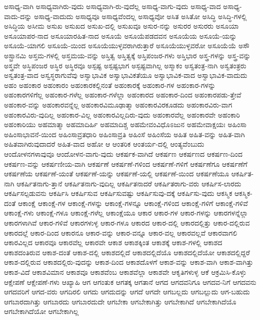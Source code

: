 {ಅಸಾಧ್ಯ-ವಾಗಿ
ಅಸಾಧ್ಯವಾಗಿರು-ವುದು
ಅಸಾಧ್ಯವಾಗಿ-ರು-ವುದೆಲ್ಲ
ಅಸಾಧ್ಯ-ವಾಗು-ವುದು
ಅಸಾಧ್ಯ-ವಾದ
ಅಸಾಧ್ಯ-ವಾದು-ದನ್ನು
ಅಸಾಧ್ಯ-ವಾದುದು
ಅಸಾಧ್ಯವೂ
ಅಸಾಧ್ಯವೆಂದಲ್ಲ
ಅಸಾಧ್ಯವೋ
ಅಸಿತ
ಅಸಿತೋ
ಅಸಿದ್ಧಿ
ಅಸಿದ್ಧಿ-ಗಳಲ್ಲಿ
ಅಸಿದ್ಧಿಯ
ಅಸೀಮ
ಅಸುಖ
ಅಸುಖದ
ಅಸುಖ-ದಲ್ಲಿ
ಅಸುಖವೂ
ಅಸುರ-ನನ್ನು
ಅಸುರರ
ಅಸುರರು
ಅಸೂಯಾ
ಅಸೂಯಾಪರ-ನಾದ
ಅಸೂಯಾರಹಿತ-ನಾದ
ಅಸೂಯೆ
ಅಸೂಯೆಪಡದವನ
ಅಸೂಯೆಯ
ಅಸೂಯೆ-ಯನ್ನು
ಅಸೂಯೆ-ಯಾಗಲಿ
ಅಸೂಯೆ-ಯಿಂದ
ಅಸೂಯೆಯುಳ್ಳವರಾಗಿರುತ್ತಾರೆ
ಅಸೂಯೆಯುಳ್ಳವರೋ
ಅಸೂಯೆಯೆ
ಅಸೌ
ಅಸ್ಟ್ರಾನಮಿ
ಅಸ್ತಮ-ಗಳಲ್ಲಿ
ಅಸ್ತಮಯ-ವನ್ನು
ಅಸ್ತಿತ್ವ
ಅಸ್ತಿತ್ವಕ್ಕೆ
ಅಸ್ತಿಪಂಜರ-ಗಳು
ಅಸ್ತಿಭಾರ
ಅಸ್ತ್ರ-ಗಳನ್ನು
ಅಸ್ತ್ರ-ವನ್ನು
ಅಸ್ತ್ರವೇ
ಅಸ್ಥಿಪಂಜರ
ಅಸ್ಥಿರ
ಅಸ್ಥಿರವೂ
ಅಸ್ಪಷ್ಟ
ಅಸ್ಪಷ್ಟಭಾಗ
ಅಸ್ಪಷ್ಟವಾಗಿಲ್ಲ
ಅಸ್ಮಾಕಂ
ಅಸ್ವತಂತ್ರ-ನಾಗಿ
ಅಸ್ವತಂತ್ರರು
ಅಸ್ವತಂತ್ರ-ವಾದ
ಅಸ್ವಸ್ಥರಾಗುವೆವು
ಅಸ್ವಾಭಾವಿಕ
ಅಸ್ವಾಭಾವಿಕತೆಯೂ
ಅಸ್ವಾಭಾವಿಕ-ವಾದ
ಅಸ್ವಾಭಾವಿಕ-ವಾದುದು
ಅಹಂ
ಅಹಂಕಾರ
ಅಹಂಕಾರಂ
ಅಹಂಕಾರಕಲ್ಲಿನಂತೆ
ಅಹಂಕಾರಕ್ಕೆ
ಅಹಂಕಾರ-ಗಳ
ಅಹಂಕಾರ-ಗಳನ್ನು
ಅಹಂಕಾರಗಳಿಗೆಲ್ಲ
ಅಹಂಕಾರ-ಗಳೆಲ್ಲ
ಅಹಂಕಾರ-ಗಳೆಲ್ಲಾ
ಅಹಂಕಾರದ
ಅಹಂಕಾರ-ದಿಂದ
ಅಹಂಕಾರಪಡು-ತ್ತೇವೆ
ಅಹಂಕಾರ-ವನ್ನು
ಅಹಂಕಾರವನ್ನೆಲ್ಲ
ಅಹಂಕಾರವಿಮೂಢಾತ್ಮಾ
ಅಹಂಕಾರವಿರಕೂಡದು
ಅಹಂಕಾರವಿರು-ವಾಗ
ಅಹಂಕಾರವಿರು-ವುದಿಲ್ಲ
ಅಹಂಕಾರ-ವಿಲ್ಲ
ಅಹಂಕಾರವಿಲ್ಲದಿರು-ವುದು
ಅಹಂಕಾರವೆಲ್ಲ
ಅಹಂಕಾರವೇ
ಅಹಂಕಾರಿ
ಅಹಂಕಾರಿಯು
ಅಹಮಾತ್ಮಾ
ಅಹಮಾದಿರ್ಹಿ
ಅಹಮಾದಿಶ್ಚ
ಅಹಮೇವಂವಿಧೊಽಜುನ
ಅಹಮೇವಾಕ್ಷಯಃ
ಅಹಿಂಸಾ
ಅಹಿಂಸಾಭಾವನೆ-ಯಿಂದ
ಅಹಿಂಸಾವ್ರತಧಾರಿ
ಅಹಿಂಸಾವ್ರತಿ
ಅಹಿಂಸೆ
ಅಹಿಂಸೆಯ
ಅಹಿತ
ಅಹಿತ-ವನ್ನು
ಅಹಿತ-ವಾಗಿ
ಅಹಿತವಾಗಿರುವುದಾದರೆ
ಅಹಿತ-ವಾದ
ಅಹೋ
ಆ
ಆಂತರಿಕ
ಆಂತರ್ಯ-ದಲ್ಲಿ
ಆಂತ್ಯವೆಂಬುದು
ಆಂದೋಳನಗಳಾವುವೂ
ಆಂದೋಳನ-ವಾಗು-ವುದು
ಆಕರ್ಷಕ-ವಾಗಿದೆ
ಆಕರ್ಷಣ
ಆಕರ್ಷಣದ
ಆಕರ್ಷಣ-ದಿಂದ
ಆಕರ್ಷಣ-ವನ್ನು
ಆಕರ್ಷಣೀಯ-ವಾಗಿ
ಆಕರ್ಷಣೆ
ಆಕರ್ಷಣೆ-ಗಳಿಂದ
ಆಕರ್ಷಣೆ-ಗಳಿಗೆ
ಆಕರ್ಷಣೆಗೂ
ಆಕರ್ಷಣೆಗೆ
ಆಕರ್ಷಣೆಯ
ಆಕರ್ಷಣೆ-ಯಂತೆ
ಆಕರ್ಷಣೆ-ಯನ್ನು
ಆಕರ್ಷಣೆ-ಯಲ್ಲಿ
ಆಕರ್ಷಣೆ-ಯಿಂದ
ಆಕರ್ಷಣೆಯೂ
ಆಕರ್ಷಿತ-ನಾಗಿ
ಆಕರ್ಷಿತನಾಗು-ತ್ತಾನೆ
ಆಕರ್ಷಿತನಾಗು-ವುದಿಲ್ಲ
ಆಕರ್ಷಿತನಾದರೆ
ಆಕರ್ಷಿತರಾಗು-ವರು
ಆಕರ್ಷಿಸ-ಲಾರದು
ಆಕರ್ಷಿಸಲ್ಪಡುವನು
ಆಕರ್ಷಿಸಿ
ಆಕರ್ಷಿಸುವ
ಆಕರ್ಷಿಸುವಷ್ಟು
ಆಕರ್ಷಿಸುವು-ದಕ್ಕೆ
ಆಕರ್ಷಿಸು-ವುದು
ಆಕಸ್ಮಿಕ
ಆಕಸ್ಮಿಕ-ದಂತೆ
ಆಕಾಂಕ್ಷೆ
ಆಕಾಂಕ್ಷೆ-ಗಳ
ಆಕಾಂಕ್ಷೆ-ಗಳನ್ನು
ಆಕಾಂಕ್ಷೆ-ಗಳನ್ನೂ
ಆಕಾಂಕ್ಷೆ-ಗಳಿಂದ
ಆಕಾಂಕ್ಷೆ-ಗಳಿಗೆ
ಆಕಾಂಕ್ಷೆ-ಗಳಿವೆ
ಆಕಾಂಕ್ಷೆ-ಗಳು
ಆಕಾಂಕ್ಷೆ-ಗಳೂ
ಆಕಾಂಕ್ಷೆ-ಗಳೆಲ್ಲ
ಆಕಾಂಕ್ಷೆಯೂ
ಆಕಾರ
ಆಕಾರ-ಗಳ
ಆಕಾರ-ಗಳನ್ನು
ಆಕಾರಗಳನ್ನೆಲ್ಲಾ
ಆಕಾರಗಳಾಗಿವೆ
ಆಕಾರ-ಗಳಿವೆ
ಆಕಾರಗಳುಳ್ಳ
ಆಕಾರ-ಗಳೂ
ಆಕಾರದ
ಆಕಾರ-ದಲ್ಲಿ
ಆಕಾರದಲ್ಲಿತ್ತು
ಆಕಾರ-ದಲ್ಲಿರುವ
ಆಕಾರದಲ್ಲೆ
ಆಕಾರ-ದಿಂದ
ಆಕಾರನೂ
ಆಕಾರ-ವನ್ನು
ಆಕಾರ-ವನ್ನೂ
ಆಕಾರ-ವಲ್ಲ
ಆಕಾರವಲ್ಲವೆ
ಆಕಾರವಾಗಲಿ
ಆಕಾರವಿಲ್ಲದ
ಆಕಾರವೂ
ಆಕಾರವೆಲ್ಲ
ಆಕಾರವೇ
ಆಕಾಶ
ಆಕಾಶಕ್ಕಿಂತ
ಆಕಾಶಕ್ಕೆ
ಆಕಾಶ-ಗಳಲ್ಲಿ
ಆಕಾಶದ
ಆಕಾಶದಂತಿರುವ
ಆಕಾಶ-ದಂತೆ
ಆಕಾಶ-ದಲ್ಲಿ
ಆಕಾಶದಲ್ಲಿದೆ
ಆಕಾಶದಲ್ಲಿದೆಯೊ
ಆಕಾಶದಲ್ಲಿದೆಯೋ
ಆಕಾಶದಲ್ಲಿದ್ದರೆ
ಆಕಾಶ-ದಲ್ಲಿರುವ
ಆಕಾಶದಲ್ಲಿರು-ವುದನ್ನು
ಆಕಾಶ-ದಿಂದ
ಆಕಾಶದೊಳಗೆ
ಆಕಾಶ-ವನ್ನು
ಆಕಾಶ-ವಾಗಿ
ಆಕಾಶ-ವಾಗಿತ್ತು
ಆಕಾಶ-ವಿದೆ
ಆಕಾಶವಿಮಾನ
ಆಕಾಶವೂ
ಆಕಾಶವೆಂಬ
ಆಕಾಶವೆಲ್ಲಾ
ಆಕಾಶವೇ
ಆಕೃತಿಗಳುಳ್ಳ
ಆಕೆ
ಆಕ್ರಮಿಸಿ-ಕೊಳ್ಳು
ಆಕ್ಷೇಪಣೆ
ಆಕ್ಷೇಪಣೆ-ಗಳು
ಆಖ್ಯಾಹಿ
ಆಗ
ಆಗಂತುಕ
ಆಗತಕ್ಕ
ಆಗತಾನೆ
ಆಗದ
ಆಗದವನಿಗೂ
ಆಗದವ-ನಿಗೆ
ಆಗದವನು
ಆಗದವರಿಗೆ
ಆಗದ-ವರು
ಆಗದಿರಲಿ
ಆಗದು
ಆಗದುದನ್ನು
ಆಗದೆ
ಆಗದೇ
ಆಗಬಲ್ಲದು
ಆಗಬಲ್ಲುದು
ಆಗ-ಬಹುದು
ಆಗಬಾರದಾಗಿತ್ತು
ಆಗಬಾರದು
ಆಗಬಾರದುದೇ
ಆಗಬೇಕಾ
ಆಗಬೇಕಾಗಿತ್ತು
ಆಗಬೇಕಾಗಿದೆ
ಆಗಬೇಕಾಗಿದೆಯೊ
ಆಗಬೇಕಾಗಿದೆಯೋ
ಆಗಬೇಕಾಗಿಲ್ಲ
}
